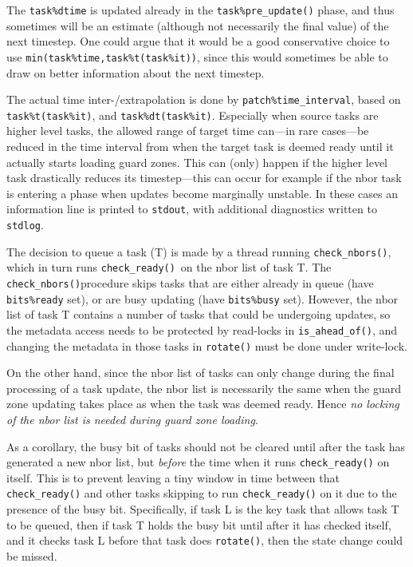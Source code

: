 \documentclass[paper=a4,fontsize=11pt]{scrartcl}
\numberwithin{equation}{section}		%
\numberwithin{figure}{section}			%
\numberwithin{table}{section}				%
\newcommand{\codecolor}{\color{Blue}}
\newcommand{\Code}[1]{{\codecolor\texttt{#1}}}
\def\checkready{\Code{check\_ready()}}
\def\checknbors{\Code{check\_nbors()}}
\def\isaheadof{\Code{is\_ahead\_of()}}
\begin{document}
The \Code{task\%dtime} is updated already in the \Code{task\%pre\_update()} phase, and thus sometimes will be an estimate (although not necessarily the final value) of the next timestep.  One could argue that it would be a good conservative choice to use \Code{min(task\%time,task\%t(task\%it))}, since this would sometimes be able to draw on better information about the next timestep.

The actual time inter-/extrapolation is done by \Code{patch\%time\_interval}, based on \Code{task\%t(task\%it)}, and \Code{task\%dt(task\%it)}.  Especially when source tasks are higher level tasks, the allowed range of target time can---in rare cases---be reduced in the time interval from when the target task is deemed ready until it actually starts loading guard zones.   This can (only) happen if the higher level task drastically reduces its timestep---this can occur for example if the nbor task is entering a phase when updates become marginally unstable.  In these cases an information line is printed to \Code{stdout}, with additional diagnostics written to \Code{stdlog}.

The decision to queue a task (T) is made by a thread running \checknbors, which in turn runs \checkready\ on the nbor list of task T. The \checknbors procedure skips tasks that are either already in queue (have \Code{bits\%ready} set), or are busy updating (have \Code{bits\%busy} set).  However, the nbor list of task T contains a number of tasks that could be undergoing updates, so the metadata access needs to be protected by read-locks in \isaheadof, and changing the metadata in those tasks in \Code{rotate()} must be done under write-lock.

On the other hand, since the nbor list of tasks can only change during the final processing of a task update, the nbor list is necessarily the same when the guard zone updating takes place as when the task was deemed ready.  Hence \textit{no locking of the nbor list is needed during guard zone loading}.

As a corollary, the busy bit of tasks should not be cleared until after the task has generated a new nbor list, but \textit{before} the time when it runs \checkready{} on itself. This is to prevent leaving a tiny window in time between that \checkready{} and other tasks skipping to run \checkready{} on it due to the presence of the busy bit.  Specifically, if task L is the key task that allows task T to be queued, then if task T holds the busy bit until after it has checked itself, and it checks task L before that task does \Code{rotate()}, then the state change could be missed.
\end{document}
